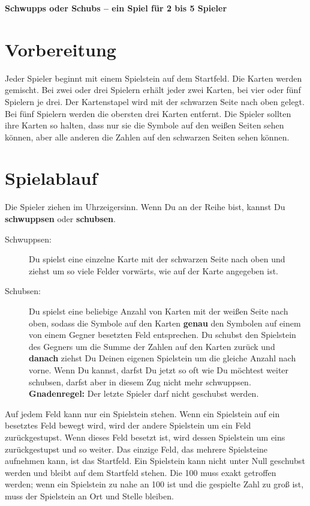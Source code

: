 \documentclass{article}
\begin{document}
{\center\LARGE\textbf{Schwupps oder Schubs -- ein Spiel für 2 bis 5 Spieler}}

\section*{Vorbereitung}

Jeder Spieler beginnt mit einem Spielstein auf dem Startfeld. Die Karten werden gemischt. Bei zwei oder drei Spielern erhält jeder zwei Karten, bei vier oder fünf Spielern je drei. Der Kartenstapel wird mit der schwarzen Seite nach oben gelegt. Bei fünf Spielern werden die obersten drei Karten entfernt. Die Spieler sollten ihre Karten so halten, dass nur sie die Symbole auf den weißen Seiten sehen können, aber alle anderen die Zahlen auf den schwarzen Seiten sehen können.

\section*{Spielablauf}

Die Spieler ziehen im Uhrzeigersinn. Wenn Du an der Reihe bist, kannst Du \textbf{schwuppsen} oder \textbf{schubsen}.

\begin{description}

\item[Schwuppsen:] 

Du spielst eine einzelne Karte mit der schwarzen Seite nach oben und ziehst um so viele Felder vorwärts, wie auf der Karte angegeben ist.

\item[Schubsen:]

Du spielst eine beliebige Anzahl von Karten mit der weißen Seite nach oben, sodass die Symbole auf den Karten \textbf{genau} den Symbolen auf einem von einem Gegner besetzten Feld entsprechen. Du schubst den Spielstein des Gegners um die Summe der Zahlen auf den Karten zurück und \textbf{danach} ziehst Du Deinen eigenen Spielstein um die gleiche Anzahl nach vorne. Wenn Du kannst, darfst Du jetzt so oft wie Du möchtest weiter schubsen, darfst aber in diesem Zug nicht mehr schwuppsen. \textbf{Gnadenregel:} Der letzte Spieler darf nicht geschubst werden.

\end{description}

Auf jedem Feld kann nur ein Spielstein stehen. Wenn ein Spielstein auf ein besetztes Feld bewegt wird, wird der andere Spielstein um ein Feld zurückgestupst. Wenn dieses Feld besetzt ist, wird dessen Spielstein um eins zurückgestupst und so weiter. Das einzige Feld, das mehrere Spielsteine aufnehmen kann, ist das Startfeld. Ein Spielstein kann nicht unter Null geschubst werden und bleibt auf dem Startfeld stehen. Die 100 muss exakt getroffen werden; wenn ein Spielstein zu nahe an 100 ist und die gespielte Zahl zu groß ist, muss der Spielstein an Ort und Stelle bleiben.
\end{document}
